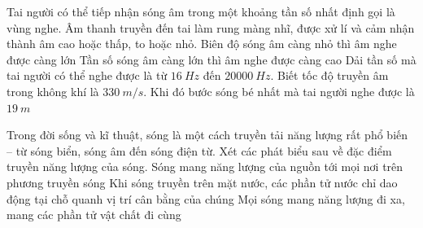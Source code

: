 \begin{ex}
Tai người có thể tiếp nhận sóng âm trong một khoảng tần số nhất định gọi là vùng nghe. Âm thanh truyền đến tai làm rung màng nhĩ, được xử lí và cảm nhận thành âm cao hoặc thấp, to hoặc nhỏ.
{Biên độ sóng âm càng nhỏ thì âm nghe được càng lớn}
{\True Tần số sóng âm càng lớn thì âm nghe được càng cao}
{Dải tần số mà tai người có thể nghe được là từ $16 ~Hz$ đến $20000 ~Hz$. Biết tốc độ truyền âm trong không khí là $330 ~m/s$. Khi đó bước sóng bé nhất mà tai người nghe được là $19 ~m$}
\loigiai{
\begin{itemchoice}
\itemch
\itemch
\itemch
\itemch
\end{itemchoice}
}
\end{ex} 
\begin{ex}
Trong đời sống và kĩ thuật, sóng là một cách truyền tải năng lượng rất phổ biến – từ sóng biển, sóng âm đến sóng điện từ. Xét các phát biểu sau về đặc điểm truyền năng lượng của sóng.
{\True Sóng mang năng lượng của nguồn tới mọi nơi trên phương truyền sóng}
{\True Khi sóng truyền trên mặt nước, các phần tử nước chỉ dao động tại chỗ quanh vị trí cân bằng của chúng}
{Mọi sóng mang năng lượng đi xa, mang các phần tử vật chất đi cùng}
\end{ex} 





